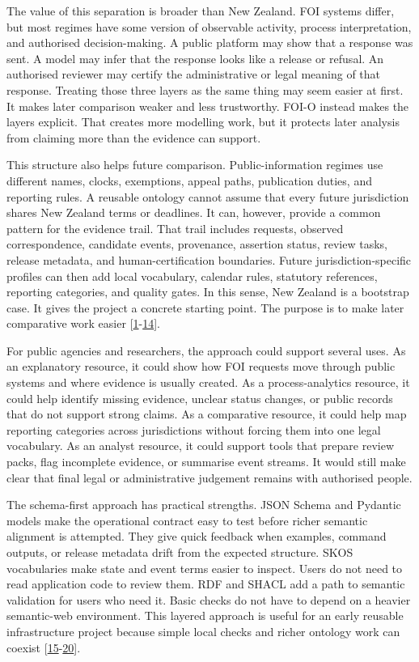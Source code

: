 \documentclass[
]{article}
\begin{document}
The value of this separation is broader than New Zealand. FOI systems
differ, but most regimes have some version of observable activity,
process interpretation, and authorised decision-making. A public
platform may show that a response was sent. A model may infer that the
response looks like a release or refusal. An authorised reviewer may
certify the administrative or legal meaning of that response. Treating
those three layers as the same thing may seem easier at first. It makes
later comparison weaker and less trustworthy. FOI-O instead makes the
layers explicit. That creates more modelling work, but it protects later
analysis from claiming more than the evidence can support.

This structure also helps future comparison. Public-information regimes
use different names, clocks, exemptions, appeal paths, publication
duties, and reporting rules. A reusable ontology cannot assume that
every future jurisdiction shares New Zealand terms or deadlines. It can,
however, provide a common pattern for the evidence trail. That trail
includes requests, observed correspondence, candidate events,
provenance, assertion status, review tasks, release metadata, and
human-certification boundaries. Future jurisdiction-specific profiles
can then add local vocabulary, calendar rules, statutory references,
reporting categories, and quality gates. In this sense, New Zealand is a
bootstrap case. It gives the project a concrete starting point. The
purpose is to make later comparative work easier {[}\hyperlink{ref-1}{1}-\hyperlink{ref-14}{14}{]}.

For public agencies and researchers, the approach could support several
uses. As an explanatory resource, it could show how FOI requests move
through public systems and where evidence is usually created. As a
process-analytics resource, it could help identify missing evidence,
unclear status changes, or public records that do not support strong
claims. As a comparative resource, it could help map reporting
categories across jurisdictions without forcing them into one legal
vocabulary. As an analyst resource, it could support tools that prepare
review packs, flag incomplete evidence, or summarise event streams. It
would still make clear that final legal or administrative judgement
remains with authorised people.

The schema-first approach has practical strengths. JSON Schema and
Pydantic models make the operational contract easy to test before richer
semantic alignment is attempted. They give quick feedback when examples,
command outputs, or release metadata drift from the expected structure.
SKOS vocabularies make state and event terms easier to inspect. Users do
not need to read application code to review them. RDF and SHACL add a
path to semantic validation for users who need it. Basic checks do not
have to depend on a heavier semantic-web environment. This layered
approach is useful for an early reusable infrastructure project because
simple local checks and richer ontology work can coexist {[}\hyperlink{ref-15}{15}-\hyperlink{ref-20}{20}{]}.
\end{document}
